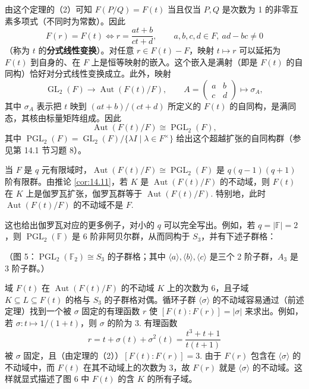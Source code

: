 由这个定理的（2）可知 \(F(P/Q) = F(t)\) 当且仅当 \(P, Q\) 是次数为 1 的非零互素多项式（不同时为常数）。因此
\[
F(r) = F(t) \iff r = \frac{at+b}{ct+d}, \qquad a, b, c, d \in F,\ ad-bc \neq 0
\]
（称为 \(t\) 的\textbf{分式线性变换}）。对任意 \(r \in F(t)-F\)，映射 \(t \mapsto r\) 可以延拓为 \(F(t)\) 到自身的、在 \(F\) 上是恒等映射的嵌入。这个嵌入是满射（即是 \(F(t)\) 的自同构）恰好对分式线性变换成立。此外，映射
\[
\operatorname{GL}_2(F) \to \operatorname{Aut}(F(t)/F), \qquad A = \begin{pmatrix} a & b\\ c & d\end{pmatrix} \mapsto \sigma_A,
\]
其中 \(\sigma_A\) 表示把 \(t\) 映到 \((at+b)/(ct+d)\) 所定义的 \(F(t)\) 的自同构，是满同态，其核由标量矩阵组成。因此
\[
\operatorname{Aut}(F(t)/F) \cong \operatorname{PGL}_2(F),
\]
其中 \(\operatorname{PGL}_2(F) = \operatorname{GL}_2(F)/\{\lambda I \mid \lambda \in F^\times\}\) 给出这个超越扩张的自同构群（参见第 14.1 节习题 8）。

当 \(F\) 是 \(q\) 元有限域时，\(\operatorname{Aut}(F(t)/F) \cong \operatorname{PGL}_2(F)\) 是 \(q(q-1)(q+1)\) 阶有限群。由推论 \ref{cor:14.11}，若 \(K\) 是 \(\operatorname{Aut}(F(t)/F)\) 的不动域，则 \(F(t)\) 在 \(K\) 上是伽罗瓦扩张，伽罗瓦群等于 \(\operatorname{Aut}(F(t)/F)\). 特别地，此时 \(\operatorname{Aut}(F(t)/F)\) 的不动域不是 \(F\).

这也给出伽罗瓦对应的更多例子，对小的 \(q\) 可以完全写出。例如，若 \(q = |\mathbb{F}| = 2\)，则 \(\operatorname{PGL}_2(\mathbb{F})\) 是 6 阶非阿贝尔群，从而同构于 \(S_3\)，并有下述子群格：

\begin{center}

（图 5：\(\operatorname{PGL}_2(\mathbb{F}_2) \cong S_3\) 的子群格；其中 \(\langle a\rangle, \langle b\rangle, \langle c\rangle\) 是三个 2 阶子群，\(A_3\) 是 3 阶子群。）
\end{center}

域 \(F(t)\) 在 \(\operatorname{Aut}(F(t)/F)\) 的不动域 \(K\) 上的次数为 6，且子域 \(K \subseteq L \subseteq F(t)\) 的格与 \(S_3\) 的子群格对偶。循环子群 \(\langle\sigma\rangle\) 的不动域容易通过（前述定理）找到一个被 \(\sigma\) 固定的有理函数 \(r\) 使 \([F(t):F(r)] = |\sigma|\) 来求出。例如，若 \(\sigma : t \mapsto 1/(1+t)\)，则 \(\sigma\) 的阶为 3. 有理函数
\[
r = t+\sigma(t)+\sigma^2(t) = \frac{t^3+t+1}{t(t+1)}
\]
被 \(\sigma\) 固定，且（由定理的（2））\([F(t):F(r)] = 3\). 由于 \(F(r)\) 包含在 \(\langle\sigma\rangle\) 的不动域中，而 \(F(t)\) 在其不动域上的次数为 3，故 \(F(r)\) 就是 \(\langle\sigma\rangle\) 的不动域。这样就显式描述了图 6 中 \(F(t)\) 的含 \(K\) 的所有子域。

